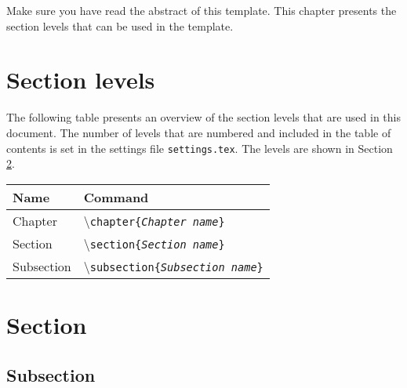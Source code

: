 
Make sure you have read the abstract of this template.
This chapter presents the section levels that can be used in the template. 

\section{Section levels}
The following table presents an overview of the section levels that are used in this document. The number of levels that are numbered and included in the table of contents is set in the settings file \texttt{settings.tex}. The levels are shown in Section \ref{Section_ref}.

\begin{table}[H]
\centering
\begin{tabular}{ll} \hline\hline
Name & Command\\ \hline
Chapter & \textbackslash\texttt{chapter\{\emph{Chapter name}\}}\\
Section & \textbackslash\texttt{section\{\emph{Section name}\}}\\
Subsection & \textbackslash\texttt{subsection\{\emph{Subsection name}\}}\\
\end{tabular}
\end{table}

\section{Section} \label{Section_ref}
\subsection{Subsection}
